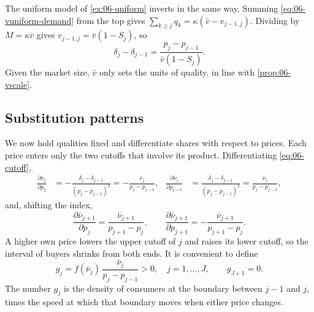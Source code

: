 The uniform model of \cref{ex:06-uniform} inverts in the same way. Summing \eqref{eq:06-vuniform-demand} from
the top gives $\sum_{k \ge j} q_k = \kappa(\bar v - v_{j-1,j})$. Dividing by $M = \kappa\bar v$ gives
$v_{j-1,j} = \bar v(1 - S_j)$, so
\begin{equation*}
  \delta_j - \delta_{j-1} = \frac{p_j - p_{j-1}}{\bar v(1 - S_j)} .
\end{equation*}
Given the market size, $\bar v$ only sets the units of quality, in line with \cref{prop:06-vscale}.

\subsection{Substitution patterns}\label{sec:06-vsubst}

We now hold qualities fixed and differentiate shares with respect to prices. Each price enters only the
two cutoffs that involve its product. Differentiating \eqref{eq:06-cutoff},
\begin{align*}
  \frac{\partial\bar\nu_j}{\partial p_j} &= -\frac{\delta_j - \delta_{j-1}}{(p_j - p_{j-1})^2} = -\frac{\bar\nu_j}{p_j - p_{j-1}},
  &
  \frac{\partial\bar\nu_j}{\partial p_{j-1}} &= \frac{\delta_j - \delta_{j-1}}{(p_j - p_{j-1})^2} = \frac{\bar\nu_j}{p_j - p_{j-1}},
\end{align*}
and, shifting the index,
\begin{equation*}
  \frac{\partial\bar\nu_{j+1}}{\partial p_j} = \frac{\bar\nu_{j+1}}{p_{j+1} - p_j},
  \qquad
  \frac{\partial\bar\nu_{j+1}}{\partial p_{j+1}} = -\frac{\bar\nu_{j+1}}{p_{j+1} - p_j}.
\end{equation*}
A higher own price lowers the upper cutoff of $j$ and raises its lower cutoff, so the interval of buyers
shrinks from both ends. It is convenient to define
\begin{equation}\label{eq:06-gj}
  g_j = f(\bar\nu_j)\,\frac{\bar\nu_j}{p_j - p_{j-1}} > 0, \quad j = 1, \dots, J, \qquad g_{J+1} = 0 .
\end{equation}
The number $g_j$ is the density of consumers at the boundary between $j - 1$ and $j$, times the speed at
which that boundary moves when either price changes.


